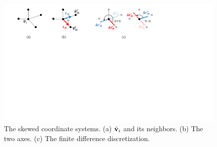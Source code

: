 \begin{figure}
    \centering
    \includegraphics[width=1\linewidth]{chapter3/tex/figures/active_model_axes.pdf}
    \caption{\small The skewed coordinate systems. (a) $\hat{\mathbf{v}}_i$ and its neighbors. (b) The two axes. (c) The finite difference discretization.}
    \label{ch3:fig:coords}
\end{figure}